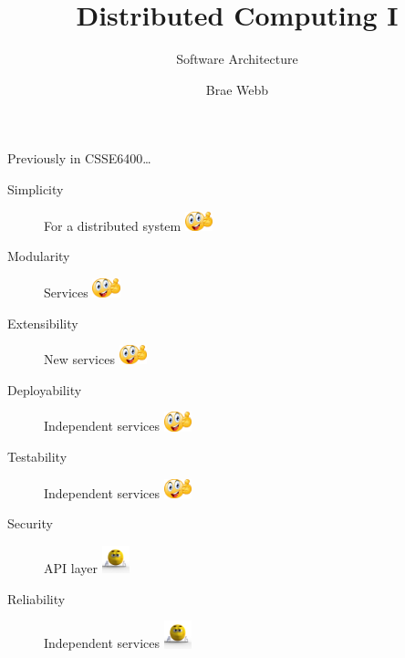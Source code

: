 \documentclass{slide}
\title{Distributed Computing I}
\subtitle{Software Architecture}
\author{Brae Webb}
\date{\week{5}}
\begin{document}
\maketitle




\begin{frame}{Previously in CSSE6400\dots}
    \vspace{1mm}
    {\LARGE
    \begin{description}
        \item[Simplicity] For a distributed system \tabto{15em}\includegraphics[width=8mm]{../../shared/images/thumbs-up.png}
        \item[Modularity] Services \tabto{15em}\includegraphics[width=8mm]{../../shared/images/thumbs-up.png}
        \item[Extensibility] New services \tabto{15em}\includegraphics[width=8mm]{../../shared/images/thumbs-up.png}
        \item[Deployability] Independent services \tabto{15em}\includegraphics[width=8mm]{../../shared/images/thumbs-up.png}
        \item[Testability] Independent services \tabto{15em}\includegraphics[width=8mm]{../../shared/images/thumbs-up.png}
        \item[Security] API layer \tabto{15em}\includegraphics[trim=57 145 70 85,clip,width=8mm]{../../shared/images/neutral.png}
        \item[Reliability] Independent services \tabto{15em}\includegraphics[trim=57 145 70 85,clip,width=8mm]{../../shared/images/neutral.png}

\end{description}}
\end{frame}
\end{document}
